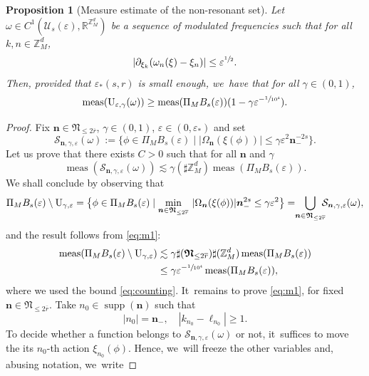\documentclass[JEP,XML,SOM,Unicode,published]{cedram}
\theoremstyle{plain}
\newtheorem{proposition}[theorem]{Proposition}
\theoremstyle{definition}
\DeclareMathOperator{\meas}{meas}
\DeclareMathOperator{\supp}{supp}
\newcommand{\nb}{{\boldsymbol n}}
\newcommand{\Nb}{{\boldsymbol{\mathfrak{N}}}}
\newcommand{\Z}{\mathbb{Z}}
\newcommand{\R}{\mathbb{R}}
\newcommand{\1}{\mathbf{1}}
\let\epsilon\varepsilon
\begin{document}
\skpt
\begin{proposition}[Measure estimate of the non-resonant set]
\label{prop:modulation}
Let $\omega \in C^{1}(\mathcal{U}_{s}(\epsilon), \R^{\Z_{M}^{d}})$ be a sequence of modulated frequencies such that for all $k,n\in\Z_{M}^{d}$,
\begin{equation}
\label{eq:as-omega}
|\partial_{\xi_{k}}(\omega_n(\xi) -\xi_{n})|\leq \epsilon^{\sfrac{1}{2}}.
\end{equation}
Then, provided that $\epsilon_{\ast}(s,r)$ is small enough, we~have that for all $\gamma\in(0,1)$,
\[
\meas(\operatorname{U}_{\epsilon,\gamma}(\omega)) \geq \meas(\Pi_{M}B_{s}(\epsilon))(1-\gamma \epsilon^{-\sfrac{1}{10^{4}}}).
\]
\end{proposition}
\begin{proof}
Fix $\nb\in\Nb_{\leq2\overline{r}}$, $\gamma\in(0,1)$, $\epsilon\in(0,\epsilon_{\ast})$ and set
\[
\mathcal{S}_{\nb,\gamma,\epsilon}(\omega)
:= \Big\{\phi\in\Pi_{M}B_s(\epsilon)\mid |\Omega_\nb(\xi(\phi))|
\leq \gamma\epsilon^2\nb_-^{-2s}\Big\}.
\]
Let us prove that there exists $C>0$ such that for all $\nb$ and $\gamma$
\begin{equation}
\label{eq:m1}
\meas(\mathcal{S}_{\nb,\gamma,\epsilon}(\omega))
\lesssim\gamma(\sharp\Z_{M}^{d})\meas(\Pi_{M}B_s(\epsilon)).
\end{equation}
We shall conclude by observing that
\[
\Pi_{M}B_{s}(\epsilon)
\setminus\operatorname{U}_{\gamma,\epsilon}
= \big\{\phi\in\Pi_{M}B_s(\epsilon) \mid \underset{\nb\in\Nb_{\leq2\overline{r}}}{\min}\ |\Omega_\nb(\xi(\phi))|\nb_-^{2s}\leq\gamma\epsilon^2\big\}
= \hspace*{-1mm}\bigcup_{\nb\in\Nb_{\leq2\overline{r}}}\hspace*{-2mm}\mathcal{S}_{\nb,\gamma,\epsilon}(\omega),
\]
and the result follows from \eqref{eq:m1}:
\begin{align*}
\meas(\Pi_{M}B_{s}(\epsilon)
\setminus\operatorname{U}_{\gamma,\epsilon})
&\lesssim \gamma
\sharp(\Nb_{\leq2\overline{r}})\sharp(\Z_{M}^{d})
\meas(\Pi_{M}B_s(\epsilon)) \\
&\leq \gamma \epsilon^{-\sfrac{1}{10^{4}}}
\meas(\Pi_{M}B_s(\epsilon)),
\end{align*}
where we used the bound \eqref{eq:counting}. It~remains to prove \eqref{eq:m1}, for fixed $\nb\in\Nb_{\leq2\overline{r}}$. Take $n_0\in\supp(\nb)$ such that
\[
|n_0| = \nb_-,\quad |k_{n_{0}}-\ell_{n_{0}}|\geq1.
\]
To decide whether a function belongs to $\mathcal{S}_{\nb,\gamma,\epsilon}(\omega)$ or not, it~suffices to move the its $n_{0}$-th action $\xi_{n_0}(\phi)$. Hence, we~will freeze the other variables and, abusing notation, we~write

\end{proof}
\end{document}

